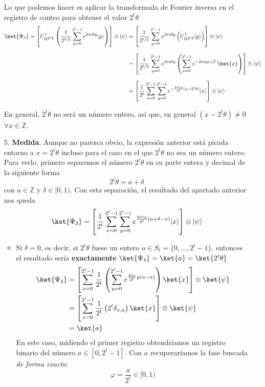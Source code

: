 \documentclass[a4paper,11pt]{book} %
\numberwithin{equation}{chapter}
\def\lp{\left(}
\def\rp{\right)}
\def\lc{\left[}
\def\rc{\right]}
\begin{document}
\begin{itemize}
Lo que podemos hacer es aplicar la transformada de Fourier inversa en el registro de conteo para obtener el valor $2^t \theta$
	\begin{align*}
	\ket{\Psi_3} = \lc U_{QFT}^\dagger \lp \frac{1}{2^{t/2}}\sum_{y=0}^{2^{t}-1}e^{{2\pi i} \theta y}|y\rangle \rp \rc \otimes \vert\psi\rangle & =  \lc \frac{1}{2^{t/2}}\sum_{y=0}^{2^{t}-1}e^{{2\pi i} \theta y} \left( U^\dagger_{QFT}|y\rangle \right) \rc \otimes \vert\psi\rangle \\ \rule{0mm}{10mm}
	& = \lc \frac{1}{2^{t/2}}\sum_{y=0}^{2^{t}-1}e^{{2\pi i} \theta y} \left( \sum^{2^t-1}_{x=0} e^{-2 \pi i y x /2^t} \ket{x} \right) \rc \otimes \vert\psi\rangle \\ \rule{0mm}{10mm}
	& = \lc \frac{1}{2^{t}} \sum_{x=0}^{2^t-1} \sum_{y=0}^{2^{t}-1}e^{-\frac{2 \pi i y}{2^t} (x-2^t \theta)} |x\rangle \rc \otimes \vert\psi\rangle
	\end{align*}

En general, $2^t \theta$ no será un número entero, así que, en general $(x-2^t \theta) \neq  0$ $\forall x \in \mathbb{Z}$.

	\item[5.] \textbf{Medida}. Aunque no parezca obvio, la expresión anterior está picada entorno a $x = 2^t \theta$ incluso para el caso en el que $2^t \theta$ no sea un número entero. Para verlo, primero separemos el número $2^t \theta$ en su parte entera y decimal de la siguiente forma
	\begin{equation*}
	2^t \theta = a + \delta
 	\end{equation*} 
con $a \in \mathbb{Z}$ y $\delta \in [0,1)$. Con esta separación, el resultado del apartado anterior nos queda
	\begin{equation} \label{ec_QPE_Psi3_2}
	\ket{\Psi_3} = \lc \frac{1}{2^{t}} \sum_{x=0}^{2^t-1} \sum_{y=0}^{2^{t}-1}e^{\frac{2 \pi i y}{2^t} (a+\delta -x )} |x\rangle \rc \otimes \vert\psi\rangle
	\end{equation}

	\begin{itemize}
		\item Si $\delta = 0$, es decir, si $2^t \theta$ fuese un entero $a \in S_t = \{ 0, \dots, 2^t-1 \}$, entonces el resultado sería \textbf{exactamente} $\ket{\Psi_4} = \ket{a} = \ket{2^t \theta}$
			\begin{align*}
			\ket{\Psi_4} & = \lc \sum_{x=0}^{2^t-1} \frac{1}{2^t} \lp \sum^{2^t-1}_{y = 0} e^{\frac{2 \pi i}{2^t} y (a-x)} \rp \ket{x} \rc \otimes \ket{\psi} \\
			& = \lc \sum_{x=0}^{2^t-1} \frac{1}{2^t} \lp 2^t \delta_{x,a} \rp \ket{x} \rc \otimes \ket{\psi} \\
			& = \ket{a}
			\end{align*}
		En este caso, midiendo el primer registro obtendríamos un registro binario del número $a\in[0, 2^t-1]$. Con $a$ recuperaríamos la fase buscada \textit{de forma exacta}:
		\begin{equation}
		\varphi = \frac{a}{2^t}  \in [0,1)
		\end{equation} 
		

\end{itemize}
\end{itemize}
\end{document}
